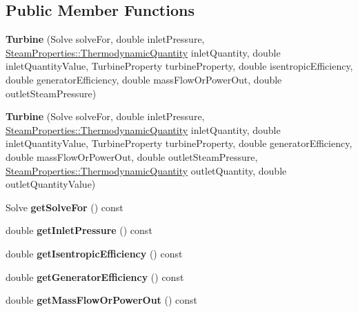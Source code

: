 \subsection*{Public Member Functions}
\begin{DoxyCompactItemize}
\item 
\mbox{\label{class_turbine_a3c3c871b9fe57d48dd06b109794381dc}} 
{\bfseries Turbine} (Solve solve\+For, double inlet\+Pressure, \hyperlink{class_steam_properties_ae0294bedf7d178c2d8fb6aed0f62fbff}{Steam\+Properties\+::\+Thermodynamic\+Quantity} inlet\+Quantity, double inlet\+Quantity\+Value, Turbine\+Property turbine\+Property, double isentropic\+Efficiency, double generator\+Efficiency, double mass\+Flow\+Or\+Power\+Out, double outlet\+Steam\+Pressure)
\item 
\mbox{\label{class_turbine_a1ec182906c075407882de542954d9030}} 
{\bfseries Turbine} (Solve solve\+For, double inlet\+Pressure, \hyperlink{class_steam_properties_ae0294bedf7d178c2d8fb6aed0f62fbff}{Steam\+Properties\+::\+Thermodynamic\+Quantity} inlet\+Quantity, double inlet\+Quantity\+Value, Turbine\+Property turbine\+Property, double generator\+Efficiency, double mass\+Flow\+Or\+Power\+Out, double outlet\+Steam\+Pressure, \hyperlink{class_steam_properties_ae0294bedf7d178c2d8fb6aed0f62fbff}{Steam\+Properties\+::\+Thermodynamic\+Quantity} outlet\+Quantity, double outlet\+Quantity\+Value)
\item 
\mbox{\label{class_turbine_a58c73057a4b890eab2af2b42c82484e6}} 
Solve {\bfseries get\+Solve\+For} () const
\item 
\mbox{\label{class_turbine_a148ad3877851f1c3931d8a6771d750c5}} 
double {\bfseries get\+Inlet\+Pressure} () const
\item 
\mbox{\label{class_turbine_a5d907859de4acc153a32bd443238b445}} 
double {\bfseries get\+Isentropic\+Efficiency} () const
\item 
\mbox{\label{class_turbine_a92266fd994310d1842ba37c05bc40bf8}} 
double {\bfseries get\+Generator\+Efficiency} () const
\item 
\mbox{\label{class_turbine_a820a090d264b96ee84f717555545c287}} 
double {\bfseries get\+Mass\+Flow\+Or\+Power\+Out} () const

\end{DoxyCompactItemize}
